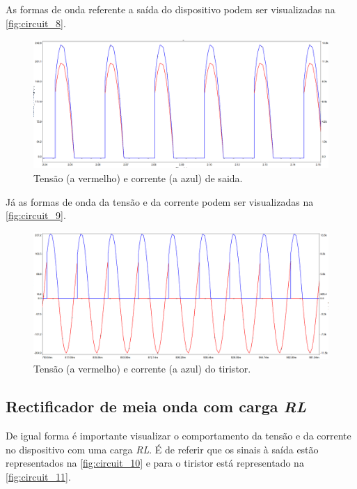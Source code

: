\documentclass[a4paper,11pt]{article}
\numberwithin{equation}{section}
\begin{document}
As formas de onda referente a saída do dispositivo podem ser visualizadas na \autoref{fig:circuit_8}.

\begin{figure}[h]
	\centering
	\includegraphics[keepaspectratio=true, scale=0.3]{img/circuito6}
	\caption{Tensão (a vermelho) e corrente (a azul) de saida.}
	\label{fig:circuit_8}
	\vspace{-0.8em}
\end{figure}

Já as formas de onda da tensão e da corrente podem ser visualizadas na  \autoref{fig:circuit_9}.

\begin{figure}[h]
	\centering
	\includegraphics[keepaspectratio=true, scale=0.3]{img/circuito7}
	\caption{Tensão (a vermelho) e corrente (a azul) do tiristor.}
	\label{fig:circuit_9}
	\vspace{-0.8em}
\end{figure}

\pagebreak
\subsection{Rectificador de meia onda com carga \textit{RL}}

De igual forma é importante visualizar o comportamento da tensão e da corrente no dispositivo com uma carga \textit{RL}. É de referir que os sinais à saída estão representados na \autoref{fig:circuit_10} e para o tiristor está representado na \autoref{fig:circuit_11}.
\end{document}
